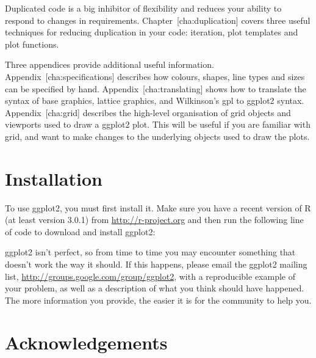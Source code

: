Duplicated code is a big inhibitor of flexibility and reduces your
ability to respond to changes in requirements.
Chapter~{[}cha:duplication{]} covers three useful techniques for
reducing duplication in your code: iteration, plot templates and plot
functions.

Three appendices provide additional useful information.
Appendix~{[}cha:specifications{]} describes how colours, shapes, line
types and sizes can be specified by hand. Appendix~{[}cha:translating{]}
shows how to translate the syntax of base graphics, lattice graphics,
and Wilkinson's gpl to ggplot2 syntax. Appendix~{[}cha:grid{]} describes
the high-level organisation of grid objects and viewports used to draw a
ggplot2 plot. This will be useful if you are familiar with grid, and
want to make changes to the underlying objects used to draw the plots.

\section{Installation}\label{sec:installation}

To use ggplot2, you must first install it. Make sure you have a recent
version of R (at least version 3.0.1) from \url{http://r-project.org}
and then run the following line of code to download and install ggplot2:

\begin{Shaded}
\begin{Highlighting}[]
\NormalTok{(}\NormalTok{)}
\end{Highlighting}
\end{Shaded}

ggplot2 isn't perfect, so from time to time you may encounter something
that doesn't work the way it should. If this happens, please email the
ggplot2 mailing list, \url{http://groups.google.com/group/ggplot2}, with
a reproducible example of your problem, as well as a description of what
you think should have happened. The more information you provide, the
easier it is for the community to help you.

\section{Acknowledgements}\label{sec:acknolwedgements}

